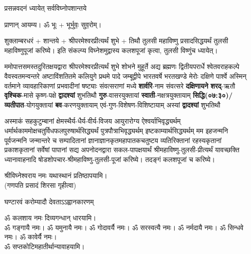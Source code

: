 
\setlength{\parindent}{0pt}




{प्रसन्नवदनं ध्यायेत् सर्वविघ्नोपशान्तये}

प्राणान्  आयम्य।  ॐ भूः + भूर्भुवः॒ सुव॒रोम्।


शुक्लाम्बरधरं + शान्तये + श्रीपरमेश्वरप्रीत्यर्थं शुभे + तिथौ तुलसी महाविष्णु प्रसादसिद्धयर्थं तुलसी महाविष्णुपूजां करिष्ये।
इति संकल्प्य विघ्नेशमुद्वास्य कलशपूजां कृत्वा, तुलसी विष्णुंच ध्यायेत्। 



ममोपात्तसमस्तदुरितक्षयद्वारा श्रीपरमेश्वर\-प्रीत्यर्थं शुभे शोभने मुहूर्ते अद्य ब्रह्मणः
द्वितीयपरार्धे श्वेतवराहकल्पे वैवस्वतमन्वन्तरे अष्टाविंशतितमे कलियुगे प्रथमे पादे
जम्बूद्वीपे भारतवर्षे भरत\-खण्डे मेरोः दक्षिणे पार्श्वे अस्मिन् वर्तमाने व्यावहारिकाणां
प्रभवादीनां षष्ट्याः संवत्सराणां मध्ये \textbf{शार्वरि}-नाम संवत्सरे \textbf{दक्षिणायने} 
\textbf{शरद्}-ऋतौ  \textbf{वृश्चिक}-मासे कृष्ण-पक्षे \textbf{द्वादश्यां} शुभतिथौ
\textbf{गुरु}-वासरयुक्तायां 
\textbf{स्वाती}-नक्षत्र\-युक्तायाम्
\textbf{सिद्धि(\RIGHTarrow ०७:३०)/ व्यतीपात}-योग\-युक्तायां
\textbf{बव}-करण\-युक्तायाम् एवं-गुण-विशेषण-विशिष्टायाम् अस्यां \textbf{द्वादश्यां} शुभतिथौ 

अस्माकं सहकुटुम्बानां क्षेमस्थैर्य-धैर्य-वीर्य-विजय आयुरारोग्य ऐश्वर्याभिवृद्ध्यर्थम्
धर्मार्थकाममोक्ष\-चतुर्विधफलपुरुषार्थसिद्ध्यर्थं पुत्रपौत्राभि\-वृद्ध्यर्थम् इष्टकाम्यार्थसिद्ध्यर्थम्
मम इहजन्मनि पूर्वजन्मनि जन्मान्तरे च सम्पादितानां ज्ञानाज्ञानकृतमहा\-पातकचतुष्टय
व्यतिरिक्तानां रहस्यकृतानां प्रकाशकृतानां सर्वेषां पापानां सद्य अपनोदनद्वारा सकल-पापक्षयार्थं श्रीमहाविष्णु-तुलसी-प्रीत्यर्थं यावच्छक्ति ध्यानावाहनादि षोडशोपचार-श्रीमहाविष्णु-तुलसी-पूजां करिष्ये। तदङ्गं कलशपूजां च करिष्ये।


श्रीविघ्नेश्वराय नमः यथास्थानं प्रतिष्ठापयामि।\\
(गणपति प्रसादं शिरसा गृहीत्वा)



{घण्टारवं करोम्यादौ देवताऽऽह्वानकारणम्}

ॐ कलशाय नमः दिव्यगन्धान् धारयामि।\\
ॐ गङ्गायै नमः। ॐ यमुनायै नमः। ॐ गोदावर्यै नमः।  ॐ सरस्वत्यै नमः। ॐ नर्मदायै नमः। ॐ सिन्धवे नमः। ॐ कावेर्यै नमः।\\
ॐ सप्तकोटिमहातीर्थान्यावाहयामि। \\

